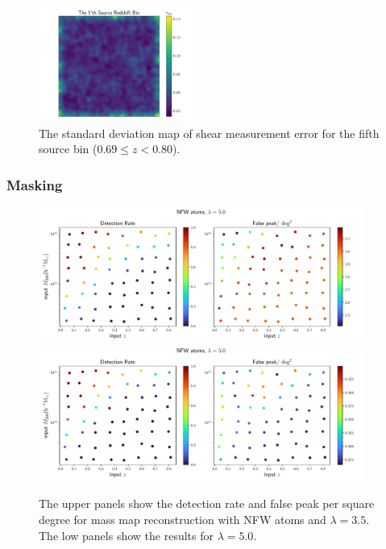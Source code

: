 \documentclass[twocolumn]{aastex62}
\begin{document}
\begin{figure}[!t]
 \centering
 \includegraphics[width=0.45\textwidth]{noise_std_map_pix.pdf}
 \caption{The standard deviation map of shear measurement error for the fifth source bin ($0.69 \leq z < 0.80 $).}
\end{figure}

\subsubsection{Masking}
\label{subsec:method-msknoise}

\begin{figure}[!t]
 \centering
 \includegraphics[width=0.95\textwidth]{detfalseRate_f3-1.pdf}
 \includegraphics[width=0.95\textwidth]{detfalseRate_f3-3.pdf}
 \caption{The upper panels show the detection rate and false peak per square degree for mass map reconstruction with
NFW atoms and $\lambda=3.5$. The low panels show the results for $\lambda=5.0$. }
\end{figure}
\end{document}
